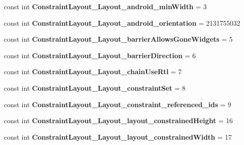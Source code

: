 \begin{DoxyCompactItemize}
const int {\bfseries Constraint\+Layout\+\_\+\+Layout\+\_\+android\+\_\+min\+Width} = 3
\item 
\mbox{\label{classst_delivery_1_1_resource_1_1_styleable_a05f03c3cfa52d36325b4f19aa2f6f947}} 
const int {\bfseries Constraint\+Layout\+\_\+\+Layout\+\_\+android\+\_\+orientation} = 2131755032
\item 
\mbox{\label{classst_delivery_1_1_resource_1_1_styleable_a7fb4ade0d8677082670249df6a1c52e0}} 
const int {\bfseries Constraint\+Layout\+\_\+\+Layout\+\_\+barrier\+Allows\+Gone\+Widgets} = 5
\item 
\mbox{\label{classst_delivery_1_1_resource_1_1_styleable_a3e87f1097395b3e96347061146ab9b5b}} 
const int {\bfseries Constraint\+Layout\+\_\+\+Layout\+\_\+barrier\+Direction} = 6
\item 
\mbox{\label{classst_delivery_1_1_resource_1_1_styleable_aa279fd2d953c26bbdfaf60468aa24a78}} 
const int {\bfseries Constraint\+Layout\+\_\+\+Layout\+\_\+chain\+Use\+Rtl} = 7
\item 
\mbox{\label{classst_delivery_1_1_resource_1_1_styleable_af41255fd091cce80f8b7896c3bf71d19}} 
const int {\bfseries Constraint\+Layout\+\_\+\+Layout\+\_\+constraint\+Set} = 8
\item 
\mbox{\label{classst_delivery_1_1_resource_1_1_styleable_a61f645414afad6a75da62d055b05a73b}} 
const int {\bfseries Constraint\+Layout\+\_\+\+Layout\+\_\+constraint\+\_\+referenced\+\_\+ids} = 9
\item 
\mbox{\label{classst_delivery_1_1_resource_1_1_styleable_a80dade55e2d33c5ebd3c9070d434c10e}} 
const int {\bfseries Constraint\+Layout\+\_\+\+Layout\+\_\+layout\+\_\+constrained\+Height} = 16
\item 
\mbox{\label{classst_delivery_1_1_resource_1_1_styleable_a72f0c3add57097eb982d7bc8712d62fb}} 
const int {\bfseries Constraint\+Layout\+\_\+\+Layout\+\_\+layout\+\_\+constrained\+Width} = 17

\end{DoxyCompactItemize}
